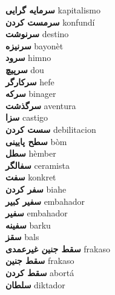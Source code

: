 \textbf{ سرمایه گرایی  } kapitalismo \\
\textbf{ سرمست کردن  } konfundí \\
\textbf{ سرنوشت  } destino \\
\textbf{ سرنیزه  } bayonèt \\
\textbf{ سرود  } himno \\
\textbf{ سرپیچ  } dou \\
\textbf{ سرکارگر  } hefe \\
\textbf{ سرکه  } binager \\
\textbf{ سرگذشت  } aventura \\
\textbf{ سزا  } castigo \\
\textbf{ سست کردن  } debilitacion \\
\textbf{ سطح پایینی  } bòm \\
\textbf{ سطل  } hèmber \\
\textbf{ سفالگر  } ceramista \\
\textbf{ سفت  } konkret \\
\textbf{ سفر کردن  } biahe \\
\textbf{ سفیر کبیر  } embahador \\
\textbf{ سفیر  } embahador \\
\textbf{ سفینه  } barku \\
\textbf{ سقز  } bals \\
\textbf{ سقط جنین غیرعمدی  } frakaso \\
\textbf{ سقط جنین  } frakaso \\
\textbf{ سقط کردن  } abortá \\
\textbf{ سلطان  } diktador \\
